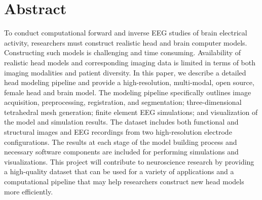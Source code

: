 %

\section*{Abstract}

To conduct computational forward and inverse EEG studies of brain electrical activity, researchers must construct realistic head and brain computer models. Constructing such models is challenging and time consuming. Availability of realistic head models and corresponding imaging data is limited in terms of both imaging modalities and patient diversity. In this paper, we describe a detailed head modeling pipeline and provide a high-resolution, multi-modal, open source, female head and brain model. The modeling pipeline specifically outlines image acquisition, preprocessing, registration, and segmentation; three-dimensional tetrahedral mesh generation; finite element EEG simulations; and visualization of the model and simulation results. The dataset includes both functional and structural images and EEG recordings from two high-resolution electrode configurations. The results at each stage of the model building process and necessary software components are included for performing simulations and visualizations. This project will contribute to neuroscience research by providing a high-quality dataset that can be used for a variety of applications and a computational pipeline that may help researchers construct new head models more efficiently.